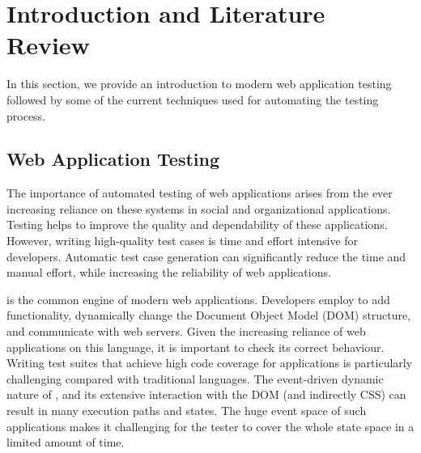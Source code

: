 \chapter{Introduction and Literature Review} \label{chap:intro}
In this section, we provide an introduction to modern web application testing followed by some of the current techniques used for automating the testing process.
 
\section{Web Application Testing} \label{Sec:web-testing}
The importance of automated testing of web applications arises from the ever increasing
reliance on these systems in social and organizational
applications. Testing helps to improve the quality and dependability of these applications. However, writing high-quality test cases is time and effort intensive for developers.
Automatic test case generation can significantly reduce the time and manual effort, while
increasing the reliability of web applications.

\javascript is the common engine of modern web applications. 
Developers employ \javascript to add functionality, dynamically change the Document Object Model (DOM) structure,
and communicate with web servers. Given the increasing reliance of web applications on this language, it is important to check its correct behaviour.
Writing test suites that achieve high code coverage for \javascript applications is particularly challenging compared with traditional languages.
The event-driven dynamic nature of \javascript, and its extensive interaction with the DOM (and indirectly CSS) can result in many execution paths and states. The huge event space of such applications makes it challenging for the tester to cover the whole state space in a limited amount of time.

